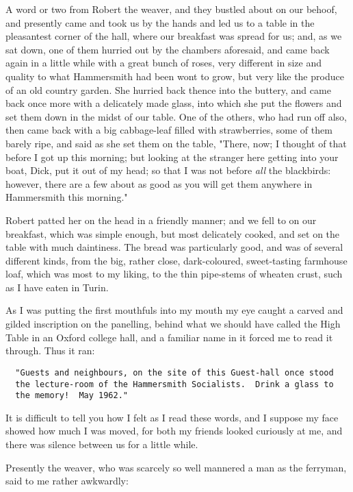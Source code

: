 A word or two from Robert the weaver, and they bustled about on our
behoof, and presently came and took us by the hands and led us to a
table in the pleasantest corner of the hall, where our breakfast was
spread for us; and, as we sat down, one of them hurried out by the
chambers aforesaid, and came back again in a little while with a great
bunch of roses, very different in size and quality to what Hammersmith
had been wont to grow, but very like the produce of an old country
garden. She hurried back thence into the buttery, and came back once
more with a delicately made glass, into which she put the flowers and
set them down in the midst of our table. One of the others, who had run
off also, then came back with a big cabbage-leaf filled with
strawberries, some of them barely ripe, and said as she set them on the
table, "There, now; I thought of that before I got up this morning; but
looking at the stranger here getting into your boat, Dick, put it out of
my head; so that I was not before \emph{all} the blackbirds: however,
there are a few about as good as you will get them anywhere in
Hammersmith this morning."

Robert patted her on the head in a friendly manner; and we fell to on
our breakfast, which was simple enough, but most delicately cooked, and
set on the table with much daintiness. The bread was particularly good,
and was of several different kinds, from the big, rather close,
dark-coloured, sweet-tasting farmhouse loaf, which was most to my
liking, to the thin pipe-stems of wheaten crust, such as I have eaten in
Turin.

As I was putting the first mouthfuls into my mouth my eye caught a
carved and gilded inscription on the panelling, behind what we should
have called the High Table in an Oxford college hall, and a familiar
name in it forced me to read it through. Thus it ran:

\begin{verbatim}
  "Guests and neighbours, on the site of this Guest-hall once stood
  the lecture-room of the Hammersmith Socialists.  Drink a glass to
  the memory!  May 1962."
\end{verbatim}

It is difficult to tell you how I felt as I read these words, and I
suppose my face showed how much I was moved, for both my friends looked
curiously at me, and there was silence between us for a little while.

Presently the weaver, who was scarcely so well mannered a man as the
ferryman, said to me rather awkwardly:

